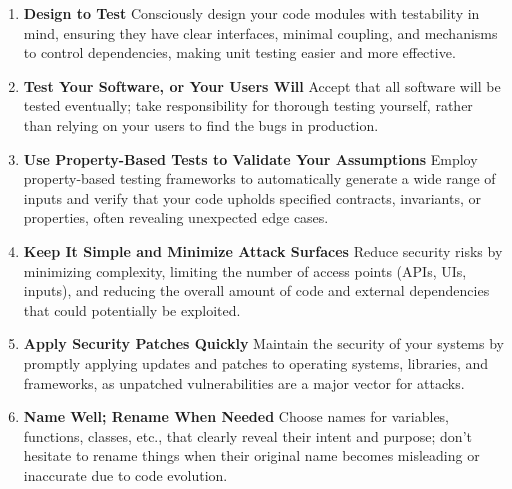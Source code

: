 \documentclass[11pt]{article}
\begin{document}
\begin{enumerate}[label=\arabic*., start=61, itemsep=1ex]
    \item \textbf{Design to Test}
    Consciously design your code modules with testability in mind, ensuring they have clear interfaces, minimal coupling, and mechanisms to control dependencies, making unit testing easier and more effective.

    \item \textbf{Test Your Software, or Your Users Will}
    Accept that all software will be tested eventually; take responsibility for thorough testing yourself, rather than relying on your users to find the bugs in production.

    \item \textbf{Use Property-Based Tests to Validate Your Assumptions}
    Employ property-based testing frameworks to automatically generate a wide range of inputs and verify that your code upholds specified contracts, invariants, or properties, often revealing unexpected edge cases.

    \item \textbf{Keep It Simple and Minimize Attack Surfaces}
    Reduce security risks by minimizing complexity, limiting the number of access points (APIs, UIs, inputs), and reducing the overall amount of code and external dependencies that could potentially be exploited.

    \item \textbf{Apply Security Patches Quickly}
    Maintain the security of your systems by promptly applying updates and patches to operating systems, libraries, and frameworks, as unpatched vulnerabilities are a major vector for attacks.

    \item \textbf{Name Well; Rename When Needed}
    Choose names for variables, functions, classes, etc., that clearly reveal their intent and purpose; don't hesitate to rename things when their original name becomes misleading or inaccurate due to code evolution.
\end{enumerate}

\newpage
\end{document}
